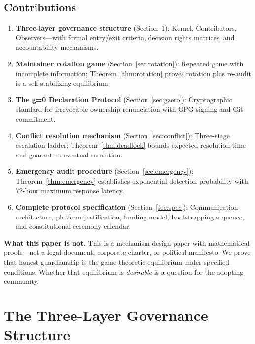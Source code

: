 \documentclass[12pt,a4paper]{article}
\theoremstyle{definition}
\newcommand{\gzero}{g=0}
\begin{document}
\subsection{Contributions}
\begin{enumerate}[label=(\roman*)]
    \item \textbf{Three-layer governance structure} (Section~\ref{sec:structure}): Kernel, Contributors, Observers---with formal entry/exit criteria, decision rights matrices, and accountability mechanisms.
    \item \textbf{Maintainer rotation game} (Section~\ref{sec:rotation}): Repeated game with incomplete information; Theorem~\ref{thm:rotation} proves rotation plus re-audit is a self-stabilizing equilibrium.
    \item \textbf{The \gzero{} Declaration Protocol} (Section~\ref{sec:gzero}): Cryptographic standard for irrevocable ownership renunciation with GPG signing and Git commitment.
    \item \textbf{Conflict resolution mechanism} (Section~\ref{sec:conflict}): Three-stage escalation ladder; Theorem~\ref{thm:deadlock} bounds expected resolution time and guarantees eventual resolution.
    \item \textbf{Emergency audit procedure} (Section~\ref{sec:emergency}): Theorem~\ref{thm:emergency} establishes exponential detection probability with 72-hour maximum response latency.
    \item \textbf{Complete protocol specification} (Section~\ref{sec:spec}): Communication architecture, platform justification, funding model, bootstrapping sequence, and constitutional ceremony calendar.
\end{enumerate}
\textbf{What this paper is not.} This is a mechanism design paper with mathematical proofs---not a legal document, corporate charter, or political manifesto. We prove that honest guardianship is the game-theoretic equilibrium under specified conditions. Whether that equilibrium is \textit{desirable} is a question for the adopting community.
\section{The Three-Layer Governance Structure}
\label{sec:structure}
\end{document}
